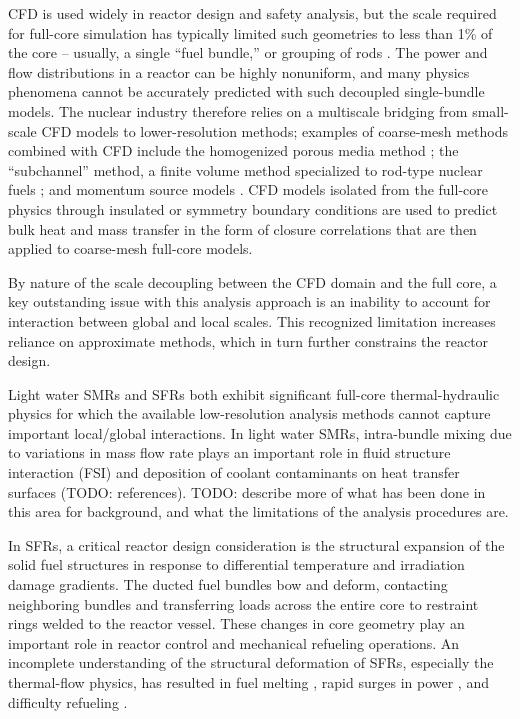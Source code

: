 \documentclass[11pt,letterpaper,english]{article}
\begin{document}
CFD is used widely in reactor design and safety analysis, but the scale required for full-core simulation has typically limited such geometries to less than 1\% of the core -- usually, a single ``fuel bundle,'' or grouping of rods \cite{wang2020,fanning,wang2020b}. The power and flow distributions in a reactor can be highly nonuniform, and many physics phenomena cannot be accurately predicted with such decoupled single-bundle models. The nuclear industry therefore relies on a multiscale bridging from small-scale CFD models to lower-resolution methods; examples of coarse-mesh methods combined with CFD include the homogenized porous media method \cite{wang2020c}; the ``subchannel'' method, a finite volume method specialized to rod-type nuclear fuels \cite{blyth}; and momentum source models \cite{hu2013}. CFD models isolated from the full-core physics through insulated or symmetry boundary conditions are used to predict bulk heat and mass transfer in the form of closure correlations that are then applied to coarse-mesh full-core models.

By nature of the scale decoupling between the CFD domain and the full core, a key outstanding issue with this analysis approach is an inability to account for interaction between global and local scales. This recognized limitation increases reliance on approximate methods, which in turn further constrains the reactor design.

Light water SMRs and SFRs both exhibit significant full-core thermal-hydraulic physics for which the available low-resolution analysis methods cannot capture important local/global interactions. In light water SMRs, intra-bundle mixing due to variations in mass flow rate plays an important role in fluid structure interaction (FSI) and deposition of coolant contaminants on heat transfer surfaces (TODO: references). TODO: describe more of what has been done in this area for background, and what the limitations of the analysis procedures are.

In SFRs, a critical reactor design consideration is the structural expansion of the solid fuel structures in response to differential temperature and irradiation damage gradients. The ducted fuel bundles bow and deform, contacting neighboring bundles and transferring loads across the entire core to restraint rings welded to the reactor vessel. These changes in core geometry play an important role in reactor control and mechanical refueling operations. An incomplete understanding of the structural deformation of SFRs, especially the thermal-flow physics, has resulted in fuel melting \cite{brittan}, rapid surges in power \cite{chaumont}, and difficulty refueling \cite{shields}.
\end{document}
